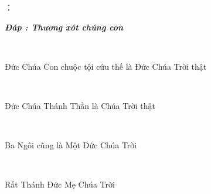 \documentclass[12pt]{article}
\begin{document}
\begin{paracol}{2}
\begin{leftcolumn*}
\Large{：\ \ \ \ }\\
\end{leftcolumn*}

\begin{rightcolumn}
\textbf{\textit{Đáp : Thương xót chúng con}}\\
\end{rightcolumn}


\begin{leftcolumn*}
\Large{\ \ \ \ \ }\\
\end{leftcolumn*}

\begin{rightcolumn}
Đức Chúa Con chuộc tội cứu thế là Đức Chúa Trời thật\\
\end{rightcolumn}

\begin{leftcolumn*}				
\Large{\ \ \ \ }\\
\end{leftcolumn*}

\begin{rightcolumn}
Đức Chúa Thánh Thần là Chúa Trời thật\\
\end{rightcolumn}

\begin{leftcolumn*}						
\Large{\ \ \ \ \ \ }\\
\end{leftcolumn*}

\begin{rightcolumn}
Ba Ngôi cũng là Một Đức Chúa Trời\\
\end{rightcolumn}

\begin{leftcolumn*}
\Large{\ \ \ }\\
\end{leftcolumn*}

\begin{rightcolumn}
Rất Thánh Đức Mẹ Chúa Trời\\
\end{rightcolumn}


\end{paracol}
\end{document}
